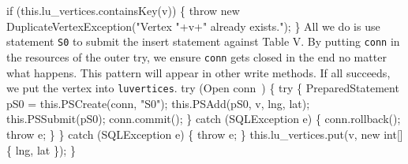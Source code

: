 \nwenddocs{}\plusendmoddef
  if (this.lu_vertices.containsKey(v)) \{
    throw new DuplicateVertexException("Vertex "+v+" already exists.");
  \}
\nwendcode{}\nwdocspar
{\small All we do is use statement {\tt{}\protect{}S0} to submit the insert statement
against Table V. By putting {\tt{}conn} in the resources of the outer try, we
ensure {\tt{}conn} gets closed in the end no matter what happens. This pattern
will appear in other write methods. If all succeeds, we put the vertex into
{\tt{}lu{}vertices}.}
\nwenddocs{}\plusendmoddef
  try (\LA{}Open \code{}conn\edoc{}~{\nwtagstyle{}}\RA{}) \{
    try \{
      PreparedStatement pS0 = this.PSCreate(conn, "S0");
      this.PSAdd(pS0, v, lng, lat);
      this.PSSubmit(pS0);
      conn.commit();
    \} catch (SQLException e) \{
      conn.rollback();
      throw e;
    \}
  \} catch (SQLException e) \{
    throw e;
  \}
  this.lu_vertices.put(v, new int[] \{ lng, lat \});
\}
\nwendcode{}\nwdocspar

